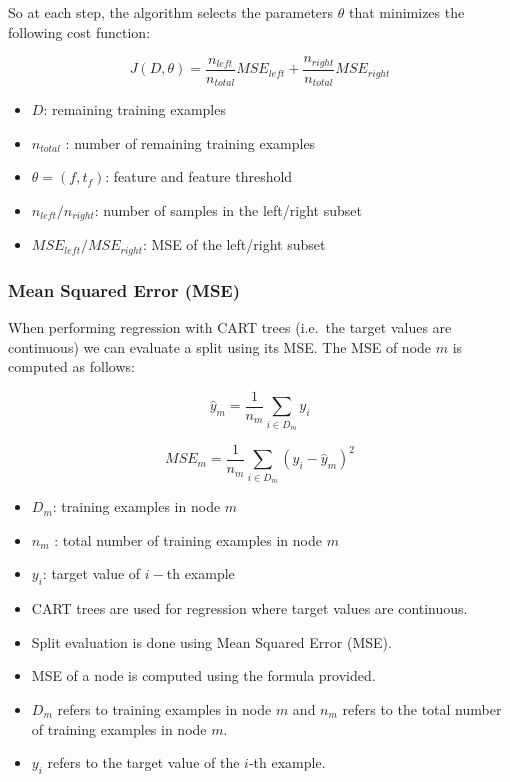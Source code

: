 \documentclass[11pt]{article}
\providecommand{\tightlist}{%
      \setlength{\itemsep}{0pt}\setlength{\parskip}{0pt}}
\begin{document}
So at each step, the algorithm selects the parameters \(\theta\) that
minimizes the following cost function:

\begin{equation}
J(D, \theta) = \frac{n_{left}}{n_{total}} MSE_{left} + \frac{n_{right}}{n_{total}} MSE_{right}
\end{equation}

\begin{itemize}
\tightlist
\item
  \(D\): remaining training examples\\
\item
  \(n_{total}\) : number of remaining training examples
\item
  \(\theta = (f, t_f)\): feature and feature threshold
\item
  \(n_{left}/n_{right}\): number of samples in the left/right subset
\item
  \(MSE_{left}/MSE_{right}\): MSE of the left/right subset
\end{itemize}

\hypertarget{mean-squared-error-mse}{%
\subsubsection{Mean Squared Error (MSE)}\label{mean-squared-error-mse}}

When performing regression with CART trees (i.e.~the target values are
continuous) we can evaluate a split using its MSE. The MSE of node \(m\)
is computed as follows:

\begin{equation}
\hat{y}_m = \frac{1}{n_{m}} \sum_{i \in D_m} y_i
\end{equation}

\begin{equation}
MSE_m = \frac{1}{n_{m}} \sum_{i \in D_m} (y_i - \hat{y}_m)^2
\end{equation}

\begin{itemize}
\tightlist
\item
  \(D_m\): training examples in node \(m\)
\item
  \(n_{m}\) : total number of training examples in node \(m\)
\item
  \(y_i\): target value of \(i-\)th example
\item
  CART trees are used for regression where target values are continuous.
\item
  Split evaluation is done using Mean Squared Error (MSE).
\item
  MSE of a node is computed using the formula provided.
\item
  \(D_m\) refers to training examples in node \(m\) and \(n_m\) refers
  to the total number of training examples in node \(m\).
\item
  \(y_i\) refers to the target value of the \(i\)-th example.
\end{itemize}
\end{document}
